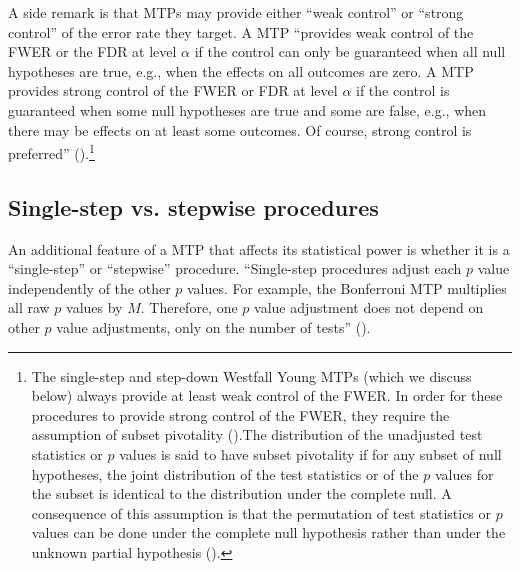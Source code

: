 \documentclass[
]{jss}
\begin{document}
A side remark is that MTPs may provide either ``weak control'' or
``strong control'' of the error rate they target. A MTP ``provides weak
control of the FWER or the FDR at level \(\alpha\) if the control can
only be guaranteed when all null hypotheses are true, e.g., when the
effects on all outcomes are zero. A MTP provides strong control of the
FWER or FDR at level \(\alpha\) if the control is guaranteed when some
null hypotheses are true and some are false, e.g., when there may be
effects on at least some outcomes. Of course, strong control is
preferred'' (\citet{Porter2018}).\footnote{The single-step and step-down
  Westfall Young MTPs (which we discuss below) always provide at least
  weak control of the FWER. In order for these procedures to provide
  strong control of the FWER, they require the assumption of subset
  pivotality (\citet{RN33093}).The distribution of the unadjusted test
  statistics or \(p\) values is said to have subset pivotality if for
  any subset of null hypotheses, the joint distribution of the test
  statistics or of the \(p\) values for the subset is identical to the
  distribution under the complete null. A consequence of this assumption
  is that the permutation of test statistics or \(p\) values can be done
  under the complete null hypothesis rather than under the unknown
  partial hypothesis (\citet{RN33093}).}

\subsection{Single-step vs. stepwise procedures}
\label{sec:stepwise}

An additional feature of a MTP that affects its statistical power is
whether it is a ``single-step'' or ``stepwise'' procedure. ``Single-step
procedures adjust each \(p\) value independently of the other \(p\)
values. For example, the Bonferroni MTP multiplies all raw \(p\) values
by \(M\). Therefore, one \(p\) value adjustment does not depend on other
\(p\) value adjustments, only on the number of tests''
(\citet{Porter2018}).
\end{document}
